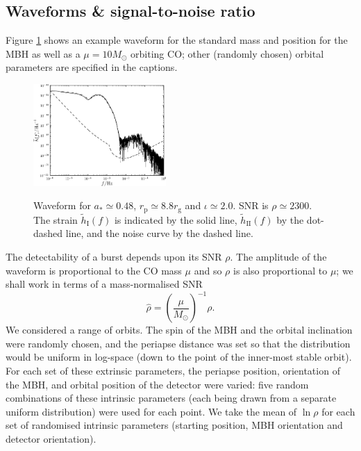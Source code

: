 \documentclass[11pt,twoside]{article}
\begin{document}
\subsection{Waveforms \& signal-to-noise ratio}

Figure \ref{fig:Examples} shows an example waveform for the standard mass and position for the MBH as well as a $\mu = 10 M_\odot$ orbiting CO; other (randomly chosen) orbital parameters are specified in the captions.
\begin{figure}
  \begin{center}
  \includegraphics[width=0.45\textwidth]{Fig_new_sph_h_254}
\label{fig:Examples}
\caption{Waveform for $a_\ast \simeq 0.48$, $r_\mathrm{p} \simeq 8.8 r_\mathrm{g}$ and $\iota \simeq 2.0$. SNR is $\rho \simeq 2300$. The strain $\widetilde{h}_\mathrm{I}(f)$ is indicated by the solid line, $\widetilde{h}_\mathrm{II}(f)$ by the dot-dashed line, and the noise curve by the dashed line.}
  \end{center}
\end{figure}

The detectability of a burst depends upon its SNR $\rho$. The amplitude of the waveform is proportional to the CO mass $\mu$ and so $\rho$ is also proportional to $\mu$; we shall work in terms of a mass-normalised SNR
\begin{equation}
\hat{\rho} = \left(\frac{\mu}{M_\odot}\right)^{-1}\rho.
\end{equation}
We considered a range of orbits. The spin of the MBH and the orbital inclination were randomly chosen, and the periapse distance was set so that the distribution would be uniform in log-space (down to the point of the inner-most stable orbit). For each set of these extrinsic parameters, the periapse position, orientation of the MBH, and orbital position of the detector were varied: five random combinations of these intrinsic parameters (each being drawn from a separate uniform distribution) were used for each point. We take the mean of $\ln \rho$ for each set of randomised intrinsic parameters (starting position, MBH orientation and detector orientation).
\end{document}
